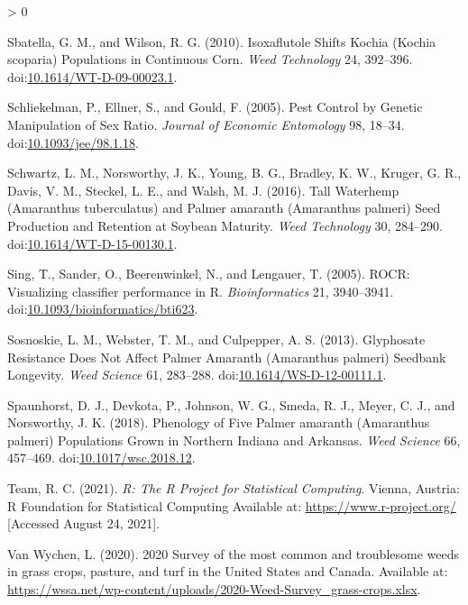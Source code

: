\documentclass[utf8]{frontiersSCNS}
\newlength{\cslhangindent}
\newenvironment{CSLReferences}[2] %
 {%
  \setlength{\parindent}{0pt}
  \ifodd #1 \everypar{\setlength{\hangindent}{\cslhangindent}}\ignorespaces\fi
  \ifnum #2 > 0
  \setlength{\parskip}{#2\baselineskip}
  \fi
 }%
 {}
\begin{document}
\begin{CSLReferences}{1}{0}
\leavevmode\hypertarget{ref-sbatella2010}{}%
Sbatella, G. M., and Wilson, R. G. (2010). Isoxaflutole {Shifts Kochia}
({Kochia} scoparia) {Populations} in {Continuous Corn}. \emph{Weed
Technology} 24, 392--396.
doi:\href{https://doi.org/10.1614/WT-D-09-00023.1}{10.1614/WT-D-09-00023.1}.

\leavevmode\hypertarget{ref-schliekelman2005}{}%
Schliekelman, P., Ellner, S., and Gould, F. (2005). Pest {Control} by
{Genetic Manipulation} of {Sex Ratio}. \emph{Journal of Economic
Entomology} 98, 18--34.
doi:\href{https://doi.org/10.1093/jee/98.1.18}{10.1093/jee/98.1.18}.

\leavevmode\hypertarget{ref-schwartz2016}{}%
Schwartz, L. M., Norsworthy, J. K., Young, B. G., Bradley, K. W.,
Kruger, G. R., Davis, V. M., Steckel, L. E., and Walsh, M. J. (2016).
Tall {Waterhemp} ({Amaranthus} tuberculatus) and {Palmer} amaranth
({Amaranthus} palmeri) {Seed Production} and {Retention} at {Soybean
Maturity}. \emph{Weed Technology} 30, 284--290.
doi:\href{https://doi.org/10.1614/WT-D-15-00130.1}{10.1614/WT-D-15-00130.1}.

\leavevmode\hypertarget{ref-sing2005}{}%
Sing, T., Sander, O., Beerenwinkel, N., and Lengauer, T. (2005). {ROCR}:
Visualizing classifier performance in {R}. \emph{Bioinformatics} 21,
3940--3941.
doi:\href{https://doi.org/10.1093/bioinformatics/bti623}{10.1093/bioinformatics/bti623}.

\leavevmode\hypertarget{ref-sosnoskie2013}{}%
Sosnoskie, L. M., Webster, T. M., and Culpepper, A. S. (2013).
Glyphosate {Resistance Does Not Affect Palmer Amaranth} ({Amaranthus}
palmeri) {Seedbank Longevity}. \emph{Weed Science} 61, 283--288.
doi:\href{https://doi.org/10.1614/WS-D-12-00111.1}{10.1614/WS-D-12-00111.1}.

\leavevmode\hypertarget{ref-spaunhorst2018}{}%
Spaunhorst, D. J., Devkota, P., Johnson, W. G., Smeda, R. J., Meyer, C.
J., and Norsworthy, J. K. (2018). Phenology of {Five Palmer} amaranth
({Amaranthus} palmeri) {Populations Grown} in {Northern Indiana} and
{Arkansas}. \emph{Weed Science} 66, 457--469.
doi:\href{https://doi.org/10.1017/wsc.2018.12}{10.1017/wsc.2018.12}.

\leavevmode\hypertarget{ref-rcoreteam2021}{}%
Team, R. C. (2021). \emph{R: {The R Project} for {Statistical
Computing}}. {Vienna, Austria}: {R Foundation for Statistical Computing}
Available at: \url{https://www.r-project.org/} {[}Accessed August 24,
2021{]}.

\leavevmode\hypertarget{ref-vanwychen2020}{}%
Van Wychen, L. (2020). 2020 {Survey} of the most common and troublesome
weeds in grass crops, pasture, and turf in the {United States} and
{Canada}. Available at:
\url{https://wssa.net/wp-content/uploads/2020-Weed-Survey_grass-crops.xlsx}.


\end{CSLReferences}
\end{document}
